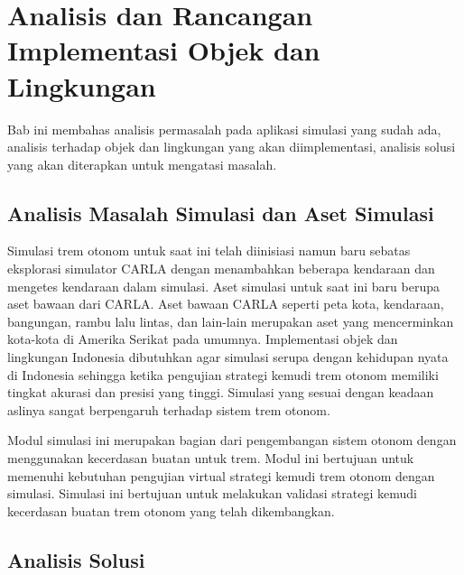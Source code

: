 \chapter{Analisis dan Rancangan Implementasi Objek dan Lingkungan}


Bab ini membahas analisis permasalah pada aplikasi simulasi yang sudah ada,
analisis terhadap objek dan lingkungan yang akan diimplementasi, analisis solusi
yang akan diterapkan untuk mengatasi masalah.

\section{Analisis Masalah Simulasi dan Aset Simulasi}
Simulasi trem otonom untuk saat ini telah diinisiasi namun baru sebatas
eksplorasi simulator CARLA dengan menambahkan beberapa kendaraan dan mengetes
kendaraan dalam simulasi. Aset simulasi untuk saat ini baru berupa aset bawaan
dari CARLA. Aset bawaan CARLA seperti peta kota, kendaraan, bangungan, rambu
lalu lintas, dan lain-lain merupakan aset yang mencerminkan kota-kota di Amerika
Serikat pada umumnya. Implementasi objek dan lingkungan Indonesia dibutuhkan
agar simulasi serupa dengan kehidupan nyata di Indonesia sehingga ketika
pengujian strategi kemudi trem otonom memiliki tingkat akurasi dan presisi yang
tinggi. Simulasi yang sesuai dengan keadaan aslinya sangat berpengaruh terhadap
sistem trem otonom.

Modul simulasi ini merupakan bagian dari pengembangan sistem otonom dengan
menggunakan kecerdasan buatan untuk trem. Modul ini bertujuan untuk memenuhi
kebutuhan pengujian virtual strategi kemudi trem otonom dengan simulasi.
Simulasi ini bertujuan untuk melakukan validasi strategi kemudi kecerdasan
buatan trem otonom yang telah dikembangkan.

\section{Analisis Solusi}







